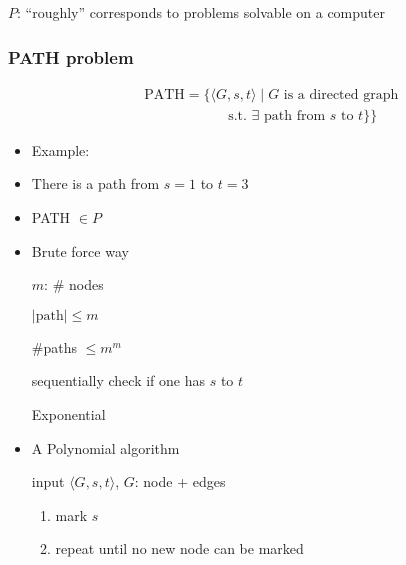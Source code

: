 \begin{frame}[allowframebreaks]
\begin{itemize}
$P$: ``roughly'' corresponds to problems solvable
on a computer



\end{itemize}\end{frame} \begin{frame}[allowframebreaks] \frametitle{PATH problem}
\begin{eqnarray*}
&&  \text{PATH}
=\{
\langle  G,s,t\rangle \mid \mbox{$G$ is a directed graph}\\
&& \qquad\qquad\qquad
\mbox{s.t. $\exists$ path from $s$ to $t$}\}
\}
\end{eqnarray*}
  \begin{itemize}
  \item Example:

  \begin{center}
\end{center}
\item[] There is a path from $s=1$ to $t=3$
\item PATH $\in P$
\item Brute force way

$m$: \# nodes

$|\text{path}|\leq m$

\#paths $\leq m^m$

sequentially check if one has $s$ to $t$

Exponential
\item A Polynomial algorithm

input $\langle  G,s,t\rangle $, $G$: node + edges
\begin{enumerate}
\item mark $s$


\item repeat until no new node can be marked


\end{enumerate}
\end{itemize}
\end{frame}
